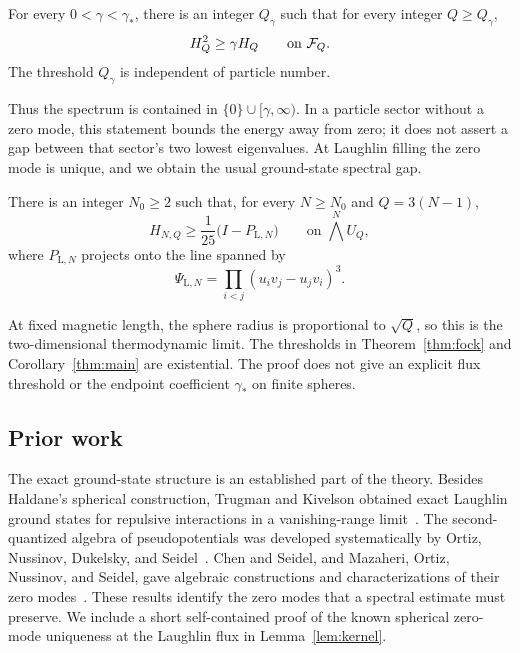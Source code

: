 \begin{theorem}\label{thm:fock}
For every \(0<\gamma<\gamma_*\), there is an integer \(Q_\gamma\) such that
for every integer \(Q\ge Q_\gamma\),
\begin{equation}\label{eq:architecture}
 H_Q^2\ge\gamma H_Q\qquad\text{on }\mathcal F_Q.
\end{equation}
The threshold \(Q_\gamma\) is independent of particle number.
\end{theorem}

Thus the spectrum is contained in \(\{0\}\cup[\gamma,\infty)\).
In a particle sector without a zero mode, this statement bounds the energy
away from zero; it does not assert a gap between that sector's two lowest
eigenvalues. At Laughlin filling the zero mode is unique, and we obtain the
usual ground-state spectral gap.

\begin{corollary}\label{thm:main}
There is an integer \(N_0\ge2\) such that, for every \(N\ge N_0\) and
\(Q=3(N-1)\),
\begin{equation}\label{eq:main}
 H_{N,Q}\ge\frac1{25}\bigl(I-P_{\mathrm L,N}\bigr)
 \qquad\text{on }\bigwedge^N U_Q,
\end{equation}
where \(P_{\mathrm L,N}\) projects onto the line spanned by
\[
 \Psi_{\mathrm L,N}=\prod_{i<j}(u_iv_j-u_jv_i)^3.
\]
\end{corollary}

At fixed magnetic length, the sphere radius is proportional to \(\sqrt Q\),
so this is the two-dimensional thermodynamic limit. The thresholds in
Theorem~\ref{thm:fock} and Corollary~\ref{thm:main} are existential.
The proof does not give an explicit flux threshold or the endpoint
coefficient \(\gamma_*\) on finite spheres.

\subsection{Prior work}
The exact ground-state structure is an established part of the theory.
Besides Haldane's spherical construction, Trugman and Kivelson obtained
exact Laughlin ground states for repulsive interactions in a vanishing-range
limit~\cite{TrugmanKivelson1985}. The second-quantized algebra of
pseudopotentials was developed systematically by Ortiz, Nussinov, Dukelsky,
and Seidel~\cite{OrtizNussinovDukelskySeidel}. Chen and Seidel, and
Mazaheri, Ortiz, Nussinov, and Seidel, gave algebraic constructions and
characterizations of their zero modes~\cite{ChenSeidel2015,MazaheriOrtizNussinovSeidel2015}.
These results identify the zero modes that a spectral estimate must preserve. We include a short self-contained proof of the known spherical
zero-mode uniqueness at the Laughlin flux in Lemma~\ref{lem:kernel}.

